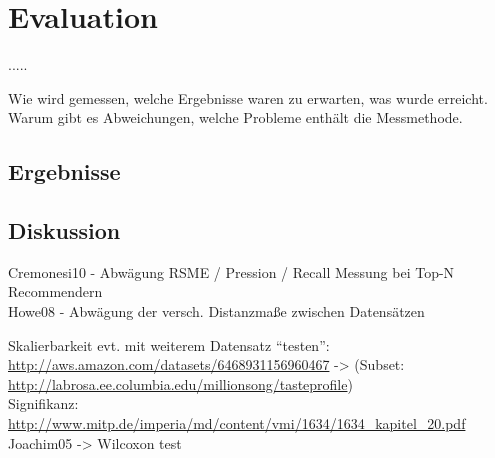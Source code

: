 \section{Evaluation}\label{sec:evaluation}\newpage.\newpage\newpage.\newpage\newpage.\newpage\newpage.\newpage\newpage.\newpage

	Wie wird gemessen, welche Ergebnisse waren zu erwarten, was wurde erreicht. Warum gibt es Abweichungen, welche Probleme enthält die Messmethode.
	
\subsection{Ergebnisse}
\subsection{Diskussion}

Cremonesi10 - Abwägung RSME / Pression / Recall Messung bei Top-N Recommendern \\
Howe08 - Abwägung der versch. Distanzmaße zwischen Datensätzen

Skalierbarkeit evt. mit weiterem Datensatz ``testen'': \\
\url{http://aws.amazon.com/datasets/6468931156960467} -> (Subset: \url{http://labrosa.ee.columbia.edu/millionsong/tasteprofile}) \\

Signifikanz: \url{http://www.mitp.de/imperia/md/content/vmi/1634/1634_kapitel_20.pdf} \\
Joachim05 -> Wilcoxon test